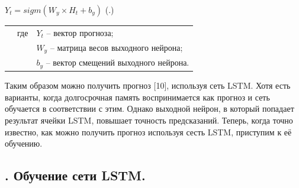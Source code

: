 {  \formulaspace \par \redline 
    $Y_t = sigm(W_y \times H_t + b_y)$
    \hfill (\thechaptercntr .\theformulacntr) \redline
  \formulaspace \addtocounter{formulacntr}{1}

  \begin{tabular}{p{}p{}p{}}
		& где  & $Y_t$ {--} вектор прогноза; \\
		& 	   & $W_y$ {--} матрица весов выходного нейрона; \\
    & 	   & $b_y$ {--} вектор смещений выходного нейрона.
  \end{tabular}

  \par \redline Таким образом можно получить прогноз [10], используя сеть LSTM. Хотя есть варианты, когда долгосрочная память воспринимается как прогноз и сеть обучается в соответствии с этим. Однако выходной нейрон, в который попадает результат ячейки LSTM, повышает точность предсказаний. Теперь, когда точно известно, как можно получить прогноз используя сесть LSTM, приступим к её обучению. 

  \par
}

\subtitlespace

\subsection*{ 
  \gostTitleFont
  \redline
  \thechaptercntr .\thesubchaptercntr \spc 
  Обучение сети LSTM.
} \addtocounter{subchaptercntr}{1} 
  
\subtitlespace
  
